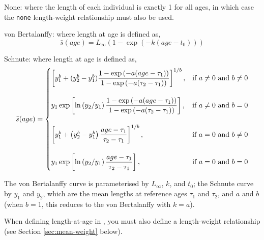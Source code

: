 \begin{description}
\item {None:} where the length of each individual is exactly 1 for all ages, in which case the \texttt{none} length-weight relationship must also be used.
\item{von Bertalanffy:} where length at age is defined as,
\begin{equation} 
\bar{s}(age)= L_\infty \left( 1 - \exp \left( -k \left(age-t_0 \right) \right) \right)
\end{equation}

\item{Schnute:} where length at age is defined as,
\begin{equation}
\bar{s}(age)=\displaystyle\begin{cases}
  \left[ y_1^b + (y_2^b - y_1^b) \dfrac{1-\exp \left(-a(age - \tau_1) \right)}{1-\exp \left(-a(\tau_2 - \tau_1) \right)} \right]^{1/b}, & \text{if $a\ne0$ and $b\ne0$} \\
  \AddVspace
  y_1 \exp \left[ \ln \left( y_2 / y_1 \right) \dfrac{1-\exp \left(-a(age - \tau_1) \right)}{1-\exp \left(-a(\tau_2 - \tau_1) \right)} \right], & \text{if $a\ne0$ and $b=0$} \\
  \AddVspace
  \left[ y_1^b + \left( y_2^b - y_1^b \right) \dfrac{age-\tau_1}{\tau_2 - \tau_1} \right]^{1/b}, & \text{if $a=0$ and $b\ne0$} \\
  \AddVspace
  y_1 \exp \left[ \ln \left( y_2/y_1 \right) \dfrac{age-\tau_1}{\tau_2 - \tau_1} \right] , & \text{if $a=0$ and $b=0$} \\
  \end{cases}
\end{equation}
\end{description}

The von Bertalanffy curve is parameterised by $L_\infty$, $k$, and $t_0$; the Schnute curve \citep{836} by $y_1$ and $y_2$, which are the mean lengths at reference ages $\tau_1$ and $\tau_2$, and $a$ and $b$ (when $b=1$, this reduces to the von Bertalanffy with $k=a$). 

When defining length-at-age in \CNAME, you must also define a length-weight relationship (see Section \ref{sec:mean-weight} below).

\subsubsection*{}

